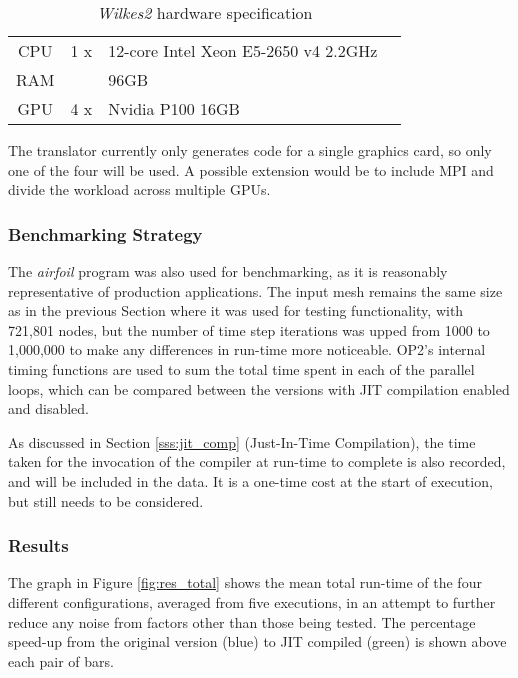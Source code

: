 \begin{table}[h]
  \centering
  \renewcommand{\arraystretch}{1.5}
  \caption{\textit{Wilkes2} hardware specification}
  \label{tab:wilkes2}
\begin{tabular}{c |r l c}
CPU & 1 x&12-core Intel Xeon E5-2650 v4 2.2GHz & \cite{xeon}\\
RAM & &96GB &\\
GPU & 4 x&Nvidia P100 16GB &\cite{p100}\\
\end{tabular}
\end{table}

\noindent The translator currently only generates code for a single graphics card, so only one of the four will be used. A possible extension would be to include MPI and divide the workload across multiple GPUs.

\subsubsection{Benchmarking Strategy}
The \textit{airfoil} program was also used for benchmarking, as it is reasonably representative of production applications. The input mesh remains the same size as in the previous Section where it was used for testing functionality, with 721,801 nodes, but the number of time step iterations was upped from 1000 to 1,000,000 to make any differences in run-time more noticeable. OP2's internal timing functions are used to sum the total time spent in each of the parallel loops, which can be compared between the versions with JIT compilation enabled and disabled.
\par
As discussed in Section \ref{sss:jit_comp} (Just-In-Time Compilation), the time taken for the invocation of the compiler at run-time to complete is also recorded, and will be included in the data. It is a one-time cost at the start of execution, but still needs to be considered.
\clearpage
\subsubsection{Results}
The graph in Figure \ref{fig:res_total} shows the mean total run-time of the four different configurations, averaged from five executions, in an attempt to further reduce any noise from factors other than those being tested. The percentage speed-up from the original version (blue) to JIT compiled (green) is shown above each pair of bars.

